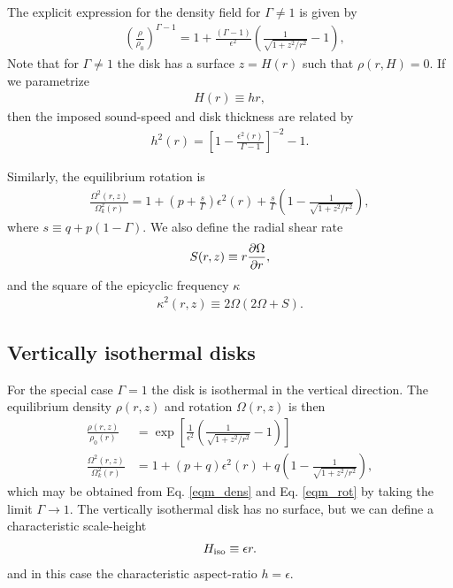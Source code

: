 The explicit expression for the density field for
$\Gamma\neq1$ is given  by
\begin{align}\label{eqm_dens}
  &\left(\frac{\rho}{\rho_0}\right)^{\Gamma-1} = 1 +
  \frac{\left(\Gamma-1\right)}{\epsilon^2}\left(\frac{1}{\sqrt{1+z^2/r^2}}-1\right),
\end{align}
Note that for $\Gamma\neq1$ the disk has a surface $z=H(r)$ such that
$\rho(r,H)=0$. If we parametrize
\begin{align}
  H(r)\equiv h r,
\end{align}
then the imposed sound-speed and disk thickness are related by 
\begin{align}
  h^2(r) = \left[1-\frac{\epsilon^2(r)}{\Gamma-1}\right]^{-2}-1. 
\end{align}

Similarly, the equilibrium rotation is 
\begin{align}\label{eqm_rot}
  \frac{\Omega^2(r,z)}{\Omega_k^2(r)}=1 +
  \left(p+\frac{s}{\Gamma}\right)\epsilon^2(r) 
  +\frac{s}{\Gamma} \left(1-\frac{1}{\sqrt{1+z^2/r^2}}\right), 
\end{align}
where $s\equiv q+p(1-\Gamma)$. We also define the radial shear rate  
\begin{align}
  S(r,z) \equiv r\frac{\partial\Omega}{\partial r},  
\end{align}
and the square of the epicyclic frequency $\kappa$ 
\begin{align}
  \kappa^2(r,z) \equiv 2\Omega(2\Omega + S). 
\end{align}


\subsection{Vertically isothermal disks}
For the special case $\Gamma=1$ the disk is isothermal in the
vertical direction. The equilibrium density $\rho(r,z)$ and rotation
$\Omega(r,z)$ is then 
\begin{align}
  \frac{\rho(r,z)}{\rho_0(r)} &=
  \exp{\left[\frac{1}{\epsilon^2}\left(\frac{1}{\sqrt{1+z^2/r^2}}-1\right)\right]}\\    
  \frac{\Omega^2(r,z)}{\Omega_k^2(r)}& =1+ (p+q)\epsilon^2(r) + q\left(1 -
    \frac{1}{\sqrt{1+z^2/r^2}}\right),
\end{align}
which may be obtained from Eq. \ref{eqm_dens} and Eq. \ref{eqm_rot} by
taking the limit $\Gamma\to 1$. The vertically isothermal disk has no
surface, but we can define a characteristic scale-height 
\begin{align}
  \Hiso \equiv \epsilon r.%
\end{align} 
and in this case the characteristic aspect-ratio $h = \epsilon$. 

